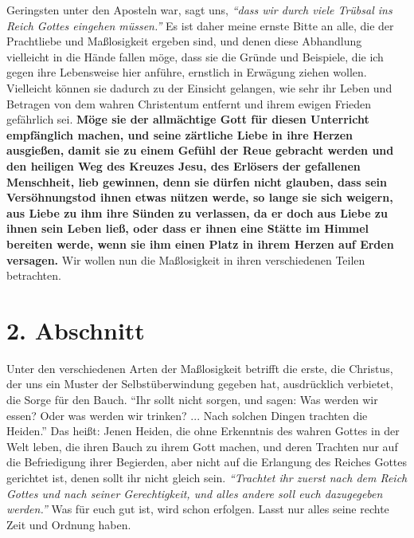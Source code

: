 Geringsten unter den Aposteln war, sagt uns,
\textit{"`dass wir durch viele Trübsal ins
Reich Gottes eingehen müssen."'}
Es ist daher meine
ernste Bitte an alle, die der Prachtliebe und
Maßlosigkeit ergeben sind, und
denen diese Abhandlung vielleicht in die Hände fallen möge, dass sie die Gründe
und Beispiele, die ich gegen ihre Lebensweise hier anführe, ernstlich in
Erwägung ziehen wollen. Vielleicht können sie dadurch zu der Einsicht gelangen,
wie sehr ihr Leben und Betragen von dem wahren
Christentum entfernt
und ihrem
ewigen Frieden gefährlich sei.
\label{ref:14_01_wahre_nachfolger_suenetod}
\textbf{Möge sie der allmächtige Gott für diesen
Unterricht empfänglich machen, und seine zärtliche Liebe in ihre Herzen
ausgießen, damit sie zu einem Gefühl der Reue gebracht werden
und den heiligen
Weg des Kreuzes Jesu, des Erlösers der
gefallenen
Menschheit, lieb gewinnen,
denn sie dürfen nicht glauben, dass sein Versöhnungstod
ihnen etwas nützen werde,
so lange sie sich weigern, aus Liebe zu ihm ihre Sünden zu
verlassen, da er doch
aus Liebe zu ihnen sein Leben ließ, oder dass er ihnen eine Stätte im Himmel
bereiten werde, wenn sie ihm einen Platz in ihrem Herzen auf Erden versagen.}
Wir
wollen nun die Maßlosigkeit
in ihren verschiedenen Teilen betrachten.

\section{2. Abschnitt} \label{kap14_ab2}

Unter den verschiedenen Arten der Maßlosigkeit betrifft die erste, die Christus,
der uns ein Muster der Selbstüberwindung gegeben hat, ausdrücklich verbietet,
die Sorge für den Bauch.
"`Ihr sollt nicht sorgen, und sagen: Was werden wir
essen? Oder was werden wir trinken? ... Nach solchen Dingen trachten die
Heiden."'
Das heißt: Jenen Heiden, die ohne
Erkenntnis des wahren Gottes in der Welt leben, die ihren
Bauch zu ihrem Gott
machen, und deren Trachten nur auf die Befriedigung ihrer
Begierden, aber nicht
auf die Erlangung des Reiches Gottes gerichtet ist, denen
sollt ihr nicht gleich
sein.
\textit{"`Trachtet ihr zuerst nach dem Reich Gottes und nach seiner
Gerechtigkeit, und alles andere soll euch dazugegeben werden."'} Was für euch
gut
ist, wird schon erfolgen. Lasst nur alles seine rechte Zeit
und Ordnung haben.

